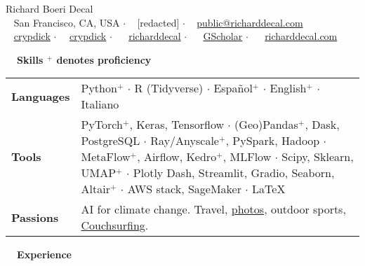 \documentclass[a4paper,12pt]{article}
\newcommand{\resheading}[1]{{\vspace*{.001in} \colorbox{mygrey}{\begin{minipage}{\textwidth}{\textmd{\large \textbf{#1} \vphantom{p\^{E}}}}\end{minipage}}} }
\newcommand{\ressubheading}[4]{
    \textbf{#1} \hfill #2\\
    \textit{#3} \hfill #4 \\}
\begin{document}
    \begin{center}
    {\Huge Richard Boeri Decal}
        \\
        {\small \faMapMarker~ San Francisco, CA, USA $\cdot$ \faPhone~ [redacted] $\cdot$ \faEnvelope~ \href{mailto:public@richarddecal.com}{public@richarddecal.com}  \\ \faGithubAlt~ \href{https://github.com/crypdick}{crypdick} $\cdot$~\faStackOverflow~  \href{https://stackoverflow.com/users/4212158/crypdick}{crypdick} $\cdot$ ~\faLinkedin~ \href{https://www.linkedin.com/in/richarddecal/}{richarddecal} $\cdot$ ~\faGraduationCap~ \href{https://scholar.google.com/citations?user=4ODJ78oAAAAJ}{GScholar}  $\cdot$ ~\faHome~  \href{http://www.richarddecal.com}{richarddecal.com}}
    \end{center}

    \resheading{~~Skills \hfill {\small$^+$ denotes proficiency}}
    \vspace{-1em}
    \begin{tabularx}{\textwidth}{p{2.1cm}>{\arraybackslash}X}
        \bfseries{Languages} & Python$^+$ $\cdot$ R (Tidyverse) $\cdot$ Espa\~nol$^+$ $\cdot$ English$^+$ $\cdot$ Italiano                                                                                                                                                                                                   \\
        \bfseries{Tools}     & PyTorch$^+$, Keras, Tensorflow  $\cdot$ (Geo)Pandas$^+$, Dask, PostgreSQL $\cdot$ Ray/Anyscale$^+$, PySpark, Hadoop $\cdot$ MetaFlow$^+$, Airflow, Kedro$^+$, MLFlow $\cdot$ Scipy, Sklearn, UMAP$^+$ $\cdot$ Plotly Dash, Streamlit, Gradio, Seaborn, Altair$^+$  $\cdot$ AWS stack, SageMaker $\cdot$  \LaTeX \\
        \bfseries{Passions}  & AI for climate change. Travel, \href{https://www.flickr.com/photos/richarddecal/sets/72157640025469005/}{photos}, outdoor sports, \href{https://www.couchsurfing.com/people/rovingrichard/references}{Couchsurfing}.
    \end{tabularx}


    \resheading{~~Experience}
    \vspace{-1em}
\end{document}
